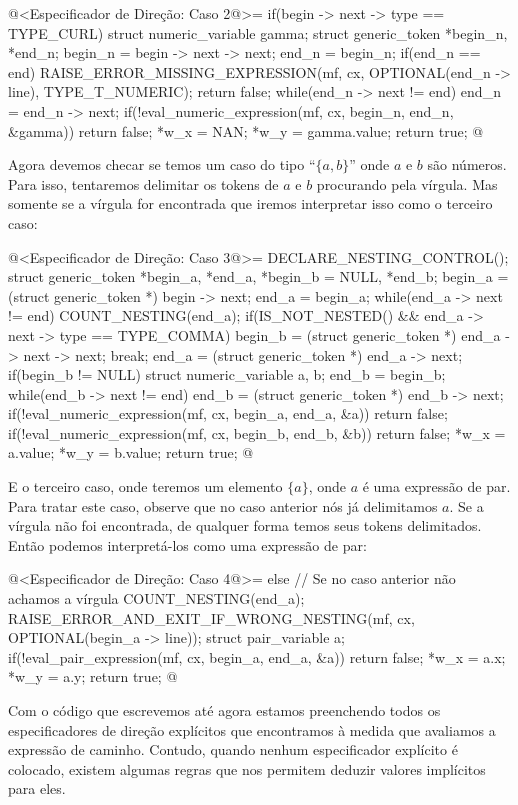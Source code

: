{{{{{{\iniciocodigo
@<Especificador de Direção: Caso 2@>=
if(begin -> next -> type == TYPE_CURL){
  struct numeric_variable gamma;
  struct generic_token *begin_n, *end_n;
  begin_n = begin -> next -> next;
  end_n = begin_n;
  if(end_n == end){
    RAISE_ERROR_MISSING_EXPRESSION(mf, cx, OPTIONAL(end_n -> line),
                                   TYPE_T_NUMERIC);
    return false;
  }
  while(end_n -> next != end)
    end_n = end_n -> next;
  if(!eval_numeric_expression(mf, cx, begin_n, end_n, &gamma))
    return false;
  *w_x = NAN;
  *w_y = gamma.value;
  return true;
}
@
\fimcodigo


Agora devemos checar se temos um caso do tipo ``$\{ a , b\}$'' onde
$a$ e $b$ são números. Para isso, tentaremos delimitar os tokens de
$a$ e $b$ procurando pela vírgula. Mas somente se a vírgula for
encontrada que iremos interpretar isso como o terceiro caso:

\iniciocodigo
@<Especificador de Direção: Caso 3@>=
DECLARE_NESTING_CONTROL();
struct generic_token *begin_a, *end_a, *begin_b = NULL, *end_b;
begin_a = (struct generic_token *) begin -> next;
end_a = begin_a;
while(end_a -> next != end){
  COUNT_NESTING(end_a);
  if(IS_NOT_NESTED() && end_a -> next -> type == TYPE_COMMA){
    begin_b = (struct generic_token *) end_a -> next -> next;
    break;
  }
  end_a = (struct generic_token *) end_a -> next;
}
if(begin_b != NULL){
  struct numeric_variable a, b;
  end_b = begin_b;
  while(end_b -> next != end)
    end_b = (struct generic_token *) end_b -> next;
  if(!eval_numeric_expression(mf, cx, begin_a, end_a, &a))
    return false;
  if(!eval_numeric_expression(mf, cx, begin_b, end_b, &b))
    return false;
  *w_x = a.value;
  *w_y = b.value;
  return true;
}
@
\fimcodigo

E o terceiro caso, onde teremos um elemento $\{a\}$, onde $a$ é uma
expressão de par. Para tratar este caso, observe que no caso anterior
nós já delimitamos $a$. Se a vírgula não foi encontrada, de qualquer
forma temos seus tokens delimitados. Então podemos interpretá-los como
uma expressão de par:

\iniciocodigo
@<Especificador de Direção: Caso 4@>=
else{ // Se no caso anterior não achamos a vírgula
  COUNT_NESTING(end_a);
  RAISE_ERROR_AND_EXIT_IF_WRONG_NESTING(mf, cx, OPTIONAL(begin_a -> line));
  struct pair_variable a;
  if(!eval_pair_expression(mf, cx, begin_a, end_a, &a))
    return false;
  *w_x = a.x;
  *w_y = a.y;
  return true;
}
@
\fimcodigo

Com o código que escrevemos até agora estamos preenchendo todos os
especificadores de direção explícitos que encontramos à medida que
avaliamos a expressão de caminho. Contudo, quando nenhum especificador
explícito é colocado, existem algumas regras que nos permitem deduzir
valores implícitos para eles.

}}}}}}
